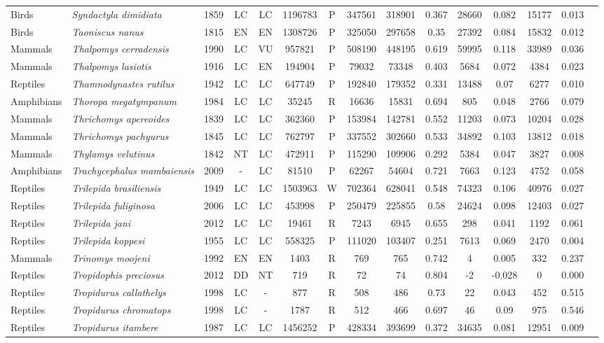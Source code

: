 \documentclass[12pt,openright,oneside,a4paper,english]{abntex2}
\begin{document}
\begin{landscape}
\begin{longtable}{llccccccccccccc}
		Birds&\textit{Syndactyla dimidiata}&1859&LC&LC&1196783&P&347561&318901&0.367&28660&0.082&15177&0.013\\
		Birds&\textit{Taoniscus nanus}&1815&EN&EN&1308726&P&325050&297658&0.35&27392&0.084&15832&0.012\\
		Mammals&\textit{Thalpomys cerradensis}&1990&LC&VU&957821&P&508190&448195&0.619&59995&0.118&33989&0.036\\
		Mammals&\textit{Thalpomys lasiotis}&1916&LC&EN&194904&P&79032&73348&0.403&5684&0.072&4384&0.023\\
		Reptiles&\textit{Thamnodynastes rutilus}&1942&LC&LC&647749&P&192840&179352&0.331&13488&0.07&6277&0.010\\
		Amphibians&\textit{Thoropa megatympanum}&1984&LC&LC&35245&R&16636&15831&0.694&805&0.048&2766&0.079\\
		Mammals&\textit{Thrichomys apereoides}&1839&LC&LC&362360&P&153984&142781&0.552&11203&0.073&10204&0.028\\
		Mammals&\textit{Thrichomys pachyurus}&1845&LC&LC&762797&P&337552&302660&0.533&34892&0.103&13812&0.018\\
		Mammals&\textit{Thylamys velutinus}&1842&NT&LC&472911&P&115290&109906&0.292&5384&0.047&3827&0.008\\
		Amphibians&\textit{Trachycephalus mambaiensis}&2009&-&LC&81510&P&62267&54604&0.721&7663&0.123&4752&0.058\\
		Reptiles&\textit{Trilepida brasiliensis}&1949&LC&LC&1503963&W&702364&628041&0.548&74323&0.106&40976&0.027\\
		Reptiles&\textit{Trilepida fuliginosa}&2006&LC&LC&453998&P&250479&225855&0.58&24624&0.098&12403&0.027\\
		Reptiles&\textit{Trilepida jani}&2012&LC&LC&19461&R&7243&6945&0.655&298&0.041&1192&0.061\\
		Reptiles&\textit{Trilepida koppesi}&1955&LC&LC&558325&P&111020&103407&0.251&7613&0.069&2470&0.004\\
		Mammals&\textit{Trinomys moojeni}&1992&EN&EN&1403&R&769&765&0.742&4&0.005&332&0.237\\
		Reptiles&\textit{Tropidophis preciosus}&2012&DD&NT&719&R&72&74&0.804&-2&-0.028&0&0.000\\
		Reptiles&\textit{Tropidurus callathelys}&1998&LC&-&877&R&508&486&0.73&22&0.043&452&0.515\\
		Reptiles&\textit{Tropidurus chromatops}&1998&LC&-&1787&R&512&466&0.697&46&0.09&975&0.546\\
		Reptiles&\textit{Tropidurus itambere}&1987&LC&LC&1456252&P&428334&393699&0.372&34635&0.081&12951&0.009\\

\end{longtable}
\end{landscape}
\end{document}
